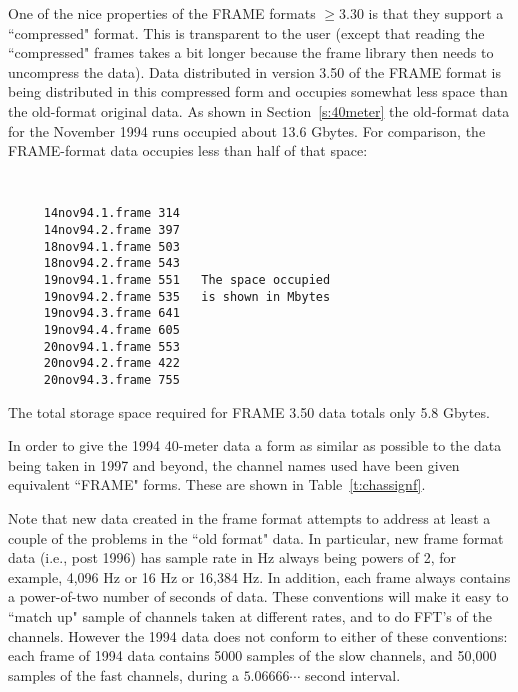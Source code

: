 One of the nice properties of the FRAME formats $\ge 3.30$ is that
they support a ``compressed" format.  This is transparent to the user
(except that reading the ``compressed" frames takes a bit longer because the
frame library then needs to uncompress the data).  Data distributed in version
3.50 of the FRAME format is being distributed in this compressed form and
occupies somewhat less space than the old-format original data. As shown
in Section~\ref{s:40meter} the old-format data for the November 1994 runs
occupied about 13.6 Gbytes. For comparison, the FRAME-format data
occupies less than half of that space:
{\tt
\begin{verbatim}
     14nov94.1.frame 314
     14nov94.2.frame 397
     18nov94.1.frame 503
     18nov94.2.frame 543
     19nov94.1.frame 551   The space occupied
     19nov94.2.frame 535   is shown in Mbytes
     19nov94.3.frame 641
     19nov94.4.frame 605
     20nov94.1.frame 553
     20nov94.2.frame 422
     20nov94.3.frame 755
\end{verbatim}
}
\noindent
The total storage space required for FRAME 3.50 data totals only 5.8 Gbytes.

In order to give the 1994 40-meter data a form as similar as possible
to the data being taken in 1997 and beyond, the channel names used
have been given equivalent ``FRAME" forms.  These are shown in
Table~\ref{t:chassignf}.

Note that new data created in the frame format attempts to address at
least a couple of the problems in the ``old format" data.  In particular,
new frame format data (i.e., post 1996) has sample rate in Hz always being
powers of 2, for example, 4,096 Hz or 16 Hz or 16,384 Hz.  In addition,
each frame always contains a power-of-two number of seconds of data.
These conventions will make it easy to ``match up" sample of channels
taken at different rates, and to do FFT's of the channels.  However the
1994 data does not conform to either of these conventions: each frame of
1994 data contains 5000 samples of the slow channels, and 50,000 samples
of the fast channels, during a $5.06666\cdots$ second interval.

